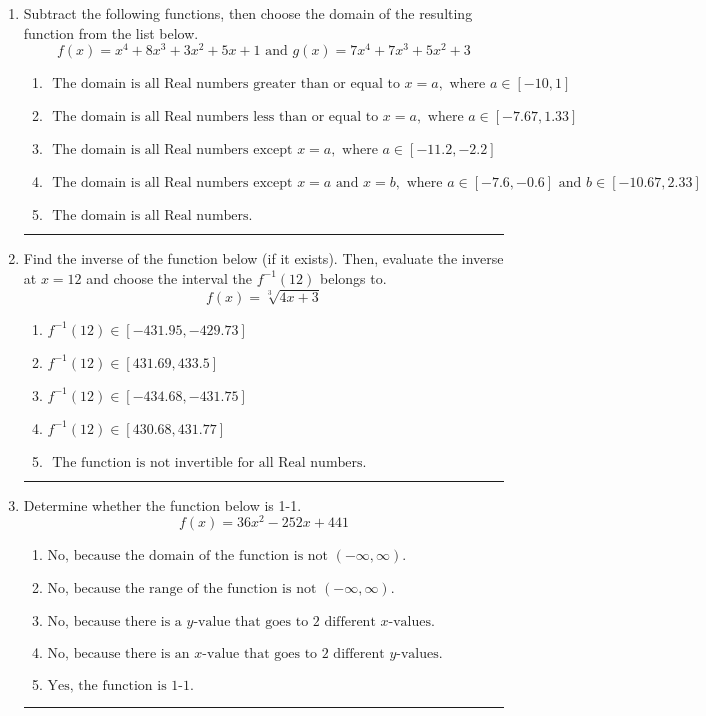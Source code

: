 \documentclass[14pt]{extbook}
\newcommand{\litem}[1]{\item#1\hspace*{-1cm}\rule{\textwidth}{0.4pt}}
\begin{document}
\begin{enumerate}
\litem{
Subtract the following functions, then choose the domain of the resulting function from the list below.\[ f(x) = x^{4} +8 x^{3} +3 x^{2} +5 x + 1 \text{ and } g(x) = 7x^{4} +7 x^{3} +5 x^{2} + 3 \]\begin{enumerate}[label=\Alph*.]
\item \( \text{ The domain is all Real numbers greater than or equal to } x = a, \text{ where } a \in [-10, 1] \)
\item \( \text{ The domain is all Real numbers less than or equal to } x = a, \text{ where } a \in [-7.67, 1.33] \)
\item \( \text{ The domain is all Real numbers except } x = a, \text{ where } a \in [-11.2, -2.2] \)
\item \( \text{ The domain is all Real numbers except } x = a \text{ and } x = b, \text{ where } a \in [-7.6, -0.6] \text{ and } b \in [-10.67, 2.33] \)
\item \( \text{ The domain is all Real numbers. } \)

\end{enumerate} }
\litem{
Find the inverse of the function below (if it exists). Then, evaluate the inverse at $x = 12$ and choose the interval the $f^{-1}(12)$ belongs to.\[ f(x) = \sqrt[3]{4 x + 3} \]\begin{enumerate}[label=\Alph*.]
\item \( f^{-1}(12) \in [-431.95, -429.73] \)
\item \( f^{-1}(12) \in [431.69, 433.5] \)
\item \( f^{-1}(12) \in [-434.68, -431.75] \)
\item \( f^{-1}(12) \in [430.68, 431.77] \)
\item \( \text{ The function is not invertible for all Real numbers. } \)

\end{enumerate} }
\litem{
Determine whether the function below is 1-1.\[ f(x) = 36 x^2 - 252 x + 441 \]\begin{enumerate}[label=\Alph*.]
\item \( \text{No, because the domain of the function is not $(-\infty, \infty)$.} \)
\item \( \text{No, because the range of the function is not $(-\infty, \infty)$.} \)
\item \( \text{No, because there is a $y$-value that goes to 2 different $x$-values.} \)
\item \( \text{No, because there is an $x$-value that goes to 2 different $y$-values.} \)
\item \( \text{Yes, the function is 1-1.} \)


\end{enumerate}}
\end{enumerate}
\end{document}
